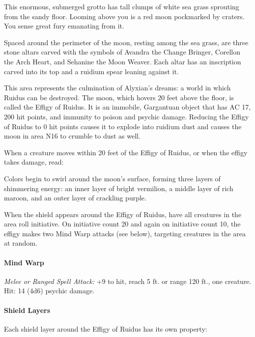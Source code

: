 \documentclass[10pt,a4paper,twoside,bg=print,twocolumn,openany,nodeprecatedcode]{dndbook}
\begin{document}
\begin{DndReadAloud}{}
This enormous, submerged grotto has tall clumps of white sea grass sprouting from the sandy floor. Looming above you is a red moon pockmarked by craters. You sense great fury emanating from it.

Spaced around the perimeter of the moon, resting among the sea grass, are three stone altars carved with the symbols of Avandra the Change Bringer, Corellon the Arch Heart, and Sehanine the Moon Weaver. Each altar has an inscription carved into its top and a ruidium spear leaning against it.

\end{DndReadAloud}

This area represents the culmination of Alyxian's dreams: a world in which Ruidus can be destroyed. The moon, which hovers 20 feet above the floor, is called the Effigy of Ruidus. It is an immobile, Gargantuan object that has AC 17, 200 hit points, and immunity to poison and psychic damage. Reducing the Effigy of Ruidus to 0 hit points causes it to explode into ruidium dust and causes the moon in area N16 to crumble to dust as well.

When a creature moves within 20 feet of the Effigy of Ruidus, or when the effigy takes damage, read:

\begin{DndReadAloud}{}
Colors begin to swirl around the moon's surface, forming three layers of shimmering energy: an inner layer of bright vermilion, a middle layer of rich maroon, and an outer layer of crackling purple.

\end{DndReadAloud}

When the shield appears around the Effigy of Ruidus, have all creatures in the area roll initiative. On initiative count 20 and again on initiative count 10, the effigy makes two Mind Warp attacks (see below), targeting creatures in the area at random.

\begin{DndComment}{}
  \paragraph{Mind Warp}
\textsl{Melee or Ranged Spell Attack:} +9 to hit, reach 5 ft. or range 120 ft., one creature. Hit: 14 (4d6) psychic damage.

\end{DndComment}

\paragraph{Shield Layers}
Each shield layer around the Effigy of Ruidus has its own property:
\end{document}
